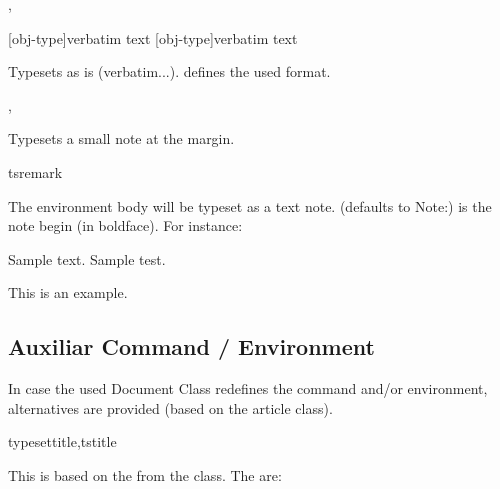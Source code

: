 \documentclass{article}
\begin{document}
\begin{codedescribe}[code]{\typesetverb,\tsverb}
\begin{codesyntax}
\tsmacro{\typesetverb}[obj-type]{verbatim text}
\tsmacro{\tsverb}[obj-type]{verbatim text}
\end{codesyntax}
 Typesets  as is (verbatim...).  defines the used format.
\end{codedescribe}

\begin{codedescribe}[code]{\typesetmarginnote,\tsmarginnote}
\begin{codesyntax}
\end{codesyntax}
Typesets a small note at the margin.
\end{codedescribe}

\begin{codedescribe}[env]{tsremark}
\begin{codesyntax}
\tsmacro{\begin{tsremark}[NB]}{}
\tsmacro{\end{tsremark}}{}
\end{codesyntax}
 The environment body will be typeset as a text note.  (defaults to Note:) is the note begin (in boldface). For instance:
 \begin{codestore}
 Sample text. Sample test.
  \begin{tsremark}[N.B.]
    This is an example.
  \end{tsremark}
 \end{codestore}
\end{codedescribe}

\subsection{Auxiliar Command / Environment}
In case the used Document Class redefines the \tsobj[code]{\maketitle} command and/or  environment, alternatives are provided (based on the article class).

\begin{codedescribe}[code]{typesettitle,tstitle}
\begin{codesyntax}
\end{codesyntax}
This is based on the \tsobj[code]{\maketitle} from the  class. The  are:
\end{codedescribe}
\end{document}
